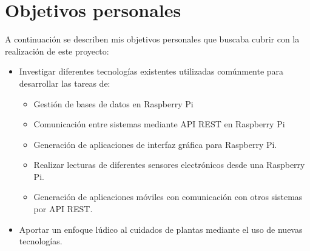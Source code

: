 \section{Objetivos personales}
A continuación se describen mis objetivos personales que buscaba cubrir con la realización de este proyecto:
\begin{itemize}
    \item Investigar diferentes tecnologías existentes utilizadas comúnmente para desarrollar las tareas de:
    \begin{itemize}
        \item Gestión de bases de datos en Raspberry Pi
        \item Comunicación entre sistemas mediante API REST en Raspberry Pi
        \item Generación de aplicaciones de interfaz gráfica para Raspberry Pi.
        \item Realizar lecturas de diferentes sensores electrónicos desde una Raspberry Pi.   
        \item Generación de aplicaciones móviles con comunicación con otros sistemas por API REST.
    \end{itemize}
    \item Aportar un enfoque lúdico al cuidados de plantas mediante el uso de nuevas tecnologías.
\end{itemize}
